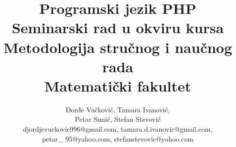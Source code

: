 \documentclass[a4paper]{article}
\begin{document}
\title{Programski jezik PHP\\ \small{Seminarski rad u okviru kursa\\Metodologija stručnog i naučnog rada\\ Matematički fakultet}}

\author{Đorđe Vučković, Tamara Ivanović,\\ Petar Simić, Stefan Stevović\\ djordjevuckovic996@gmail.com, tamara.d.ivanovic@gmail.com,\\ petar\_ 95@yahoo.com, stefanstevovic@yahoo.com}


\maketitle
\end{document}
